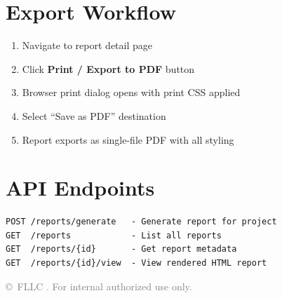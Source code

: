 \documentclass[11pt,a4paper]{article}
\begin{document}
\section{Export Workflow}
\begin{enumerate}
  \item Navigate to report detail page
  \item Click \textbf{Print / Export to PDF} button
  \item Browser print dialog opens with print CSS applied
  \item Select ``Save as PDF'' destination
  \item Report exports as single-file PDF with all styling
\end{enumerate}

\section{API Endpoints}
\begin{lstlisting}
POST /reports/generate   - Generate report for project
GET  /reports            - List all reports
GET  /reports/{id}       - Get report metadata
GET  /reports/{id}/view  - View rendered HTML report
\end{lstlisting}

\vfill
\begin{center}
\textcolor{gray}{\small\copyright\ FLLC \the\year.  For internal authorized use only.}
\end{center}
\end{document}
